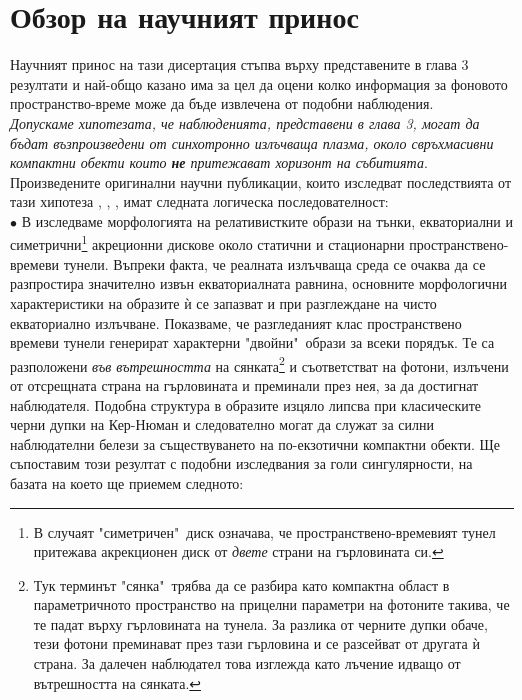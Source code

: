\section{Обзор на научният принос}

Научният принос на тази дисертация стъпва върху представените в глава 3 резултати и най-общо казано има за цел да оцени колко информация за фоновото пространство-време може да бъде извлечена от подобни наблюдения.\\

 \emph{Допускаме хипотезата, че наблюденията, представени в глава 3, могат да бъдат възпроизведени от синхотронно излъчваща плазма, около свръхмасивни компактни обекти които \textbf{не} притежават хоризонт на събитията}.\\\newline
Произведените оригинални научни публикации, които изследват последствията от тази хипотеза \cite{Deliyski2022}, \cite{Delijski2022}, \cite{Deliyski2023}, \cite{Deliyski2024} имат следната логическа последователност: \\

\noindent$\bullet$ В \cite{Deliyski2022} изследваме морфологията на релативистките образи на тънки, екваториални и симетрични\footnote{ В случаят "симетричен"$\,$ диск означава, че пространствено-времевият тунел притежава акрекционен диск от \emph{двете} страни на гърловината си.} акреционни дискове около статични и стационарни пространствено-времеви тунели. Въпреки факта, че реалната излъчваща среда се очаква да се разпростира значително извън екваториалната равнина, основните морфологични характеристики на образите ѝ се запазват и при разглеждане на чисто екваториално излъчване. Показваме, че разгледаният клас пространствено времеви тунели генерират характерни "двойни"$\,$ образи за всеки порядък. Те са разположени \emph{във вътрешността} на сянката\footnote{Тук терминът "сянка"$\,$ трябва да се разбира като компактна област в параметричното пространство на прицелни параметри на фотоните такива, че те падат върху гърловината на тунела. За разлика от черните дупки обаче, тези фотони преминават през тази гърловина и се разсейват от другата ѝ страна. За далечен наблюдател това изглежда като лъчение идващо от вътрешността на сянката.} и съответстват на фотони, излъчени от отсрещната страна на гърловината и преминали през нея, за да достигнат наблюдателя. Подобна структура в образите изцяло липсва при класическите черни дупки на Кер-Нюман и следователно могат да служат за силни наблюдателни белези за съществуването на по-екзотични компактни обекти. Ще съпоставим този резултат с подобни изследвания за голи сингулярности, на базата на което ще приемем следното:\\


